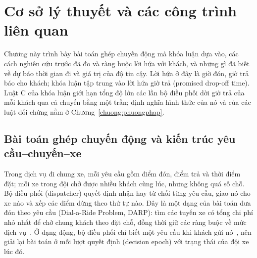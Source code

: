 
\chapter{Cơ sở lý thuyết và các công trình liên quan}
\label{chuong:coso}

Chương này trình bày bài toán ghép chuyến động mà khóa luận dựa vào, các cách nghiên cứu trước đã đo và ràng buộc
lời hứa với khách, và những gì đã biết về dự báo thời gian đi và giá trị của độ tin cậy. Lời hứa ở đây là giờ đón,
giờ trả báo cho khách; khóa luận tập trung vào lời hứa giờ trả (promised drop-off time). Luật C của khóa luận giới
hạn tổng độ lớn các lần bộ điều phối dời giờ trả của mỗi khách qua cả chuyến bằng một trần; định nghĩa hình thức của
nó và của các luật đối chứng nằm ở Chương~\ref{chuong:phuongphap}.

\section{Bài toán ghép chuyến động và kiến trúc yêu cầu--chuyến--xe}
\label{muc:c2-baitoan}

Trong dịch vụ đi chung xe, mỗi yêu cầu gồm điểm đón, điểm trả và thời điểm đặt; mỗi xe trong đội chở được nhiều
khách cùng lúc, nhưng không quá số chỗ. Bộ điều phối (dispatcher) quyết định nhận hay từ chối từng yêu cầu, giao nó
cho xe nào và xếp các điểm dừng theo thứ tự nào. Đây là một dạng của bài toán đưa đón theo yêu cầu (Dial-a-Ride
Problem, DARP): tìm các tuyến xe có tổng chi phí nhỏ nhất để chở chung khách theo đặt chỗ, đồng thời giữ các ràng
buộc về mức dịch vụ~\cite{molenbruch2017}. Ở dạng động, bộ điều phối chỉ biết một yêu cầu khi khách gửi
nó~\cite{schulz2026}, nên giải lại bài toán ở mỗi lượt quyết định (decision epoch) với trạng thái của đội xe lúc đó.

